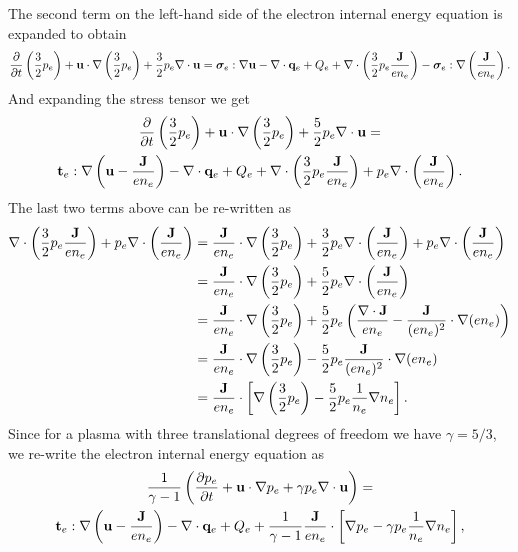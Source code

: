 \documentclass[a4paper,11pt]{report}
\begin{document}
The second term on the left-hand side of the electron internal energy equation is expanded to obtain
\begin{equation*}
    \frac{\partial}{\partial t} \left( \frac{3}{2} p_e \right) + \mathbf{u} \cdot \nabla \left( \frac{3}{2} p_e \right) + \frac{3}{2}p_e \nabla \cdot \mathbf{u} = \bm \sigma_e : \nabla \mathbf{u} - \nabla \cdot \mathbf{q}_e + Q_e + \nabla \cdot \left( \frac{3}{2} p_e \frac{\mathbf{J}}{e n_e} \right) - \bm \sigma_e : \nabla \left( \frac{\mathbf{J}}{e n_e} \right).
\end{equation*}
And expanding the stress tensor we get
\begin{multline*}
    \frac{\partial}{\partial t} \left( \frac{3}{2} p_e \right) + \mathbf{u} \cdot \nabla \left( \frac{3}{2} p_e \right) + \frac{5}{2} p_e \nabla \cdot \mathbf{u} = \\
    \mathbf{t}_e : \nabla \left( \mathbf{u} - \frac{\mathbf{J}}{e n_e} \right) - \nabla \cdot \mathbf{q}_e + Q_e + \nabla \cdot \left( \frac{3}{2} p_e \frac{\mathbf{J}}{e n_e} \right) + p_e \nabla \cdot \left( \frac{\mathbf{J}}{e n_e} \right).
\end{multline*}
The last two terms above can be re-written as
\begin{align*}
    \nabla \cdot \left( \frac{3}{2} p_e \frac{\mathbf{J}}{en_e} \right) + p_e \nabla \cdot \left( \frac{\mathbf{J}}{e n_e} \right) &= \frac{\mathbf{J}}{e n_e} \cdot \nabla \left( \frac{3}{2} p_e \right) + \frac{3}{2} p_e \nabla \cdot \left( \frac{\mathbf{J}}{en_e} \right) + p_e \nabla \cdot \left( \frac{\mathbf{J}}{e n_e} \right) \\ 
    &= \frac{\mathbf{J}}{e n_e} \cdot \nabla \left( \frac{3}{2} p_e \right) + \frac{5}{2} p_e \nabla \cdot \left( \frac{\mathbf{J}}{en_e} \right) \\
    &= \frac{\mathbf{J}}{e n_e} \cdot \nabla \left( \frac{3}{2} p_e \right) + \frac{5}{2} p_e \left( \frac{\nabla \cdot \mathbf{J}}{e n_e} - \frac{\mathbf{J}}{(e n_e)^2} \cdot \nabla (e n_e) \right) \\
    &= \frac{\mathbf{J}}{e n_e} \cdot \nabla \left( \frac{3}{2} p_e \right) - \frac{5}{2} p_e \frac{\mathbf{J}}{(e n_e)^2} \cdot \nabla (e n_e) \\
    &= \frac{\mathbf{J}}{e n_e} \cdot \left[ \nabla \left( \frac{3}{2} p_e \right) - \frac{5}{2} p_e \frac{1}{n_e} \nabla n_e \right].
\end{align*}
Since for a plasma with three translational degrees of freedom we have $\gamma = 5/3$, we re-write the electron internal energy equation as
\begin{multline*}
    \frac{1}{\gamma - 1} \left( \frac{\partial p_e}{\partial t} + \mathbf{u} \cdot \nabla p_e + \gamma p_e \nabla \cdot \mathbf{u} \right) = \\
    \mathbf{t}_e : \nabla \left( \mathbf{u} - \frac{\mathbf{J}}{e n_e} \right) - \nabla \cdot \mathbf{q}_e + Q_e + \frac{1}{\gamma - 1} \frac{\mathbf{J}}{e n_e} \cdot \left[ \nabla p_e - \gamma p_e \frac{1}{n_e} \nabla n_e \right],
\end{multline*}
\end{document}
